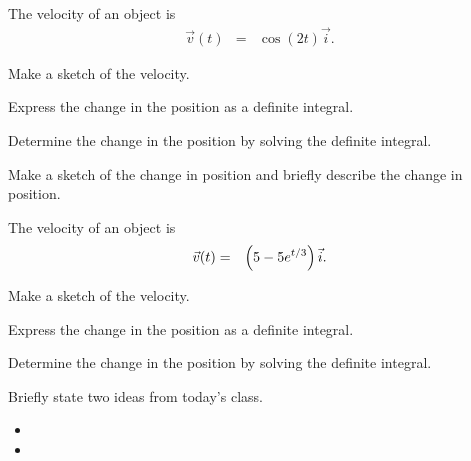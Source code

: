 \begin{problem}
\item The velocity of an object is 
  \begin{eqnarray*}
    \vec{v}(t) & = & \cos(2t) \vec{i}.
  \end{eqnarray*}
  \begin{subproblem}
  \item Make a sketch of the velocity.  
    \vfill
  \item Express the change in the position as a definite integral.
    \vfill
  \item Determine the change in the position by solving the definite
    integral.
    \vfill
  \item Make a sketch of the change in position and briefly describe
    the change in position.
    \vfill
  \end{subproblem}
  \clearpage

\item The velocity of an object is 
  \begin{eqnarray*}
    \vec{v}(t) & = & \left( 5 - 5 e^{t/3} \right) \vec{i}.
  \end{eqnarray*}
  \begin{subproblem}
  \item Make a sketch of the velocity.  
    \vfill
  \item Express the change in the position as a definite integral.
    \vfill
  \item Determine the change in the position by solving the definite
    integral.
    \vfill
  \end{subproblem}

\end{problem}

\postClass

\begin{problem}
\item Briefly state two ideas from today's class.
  \begin{itemize}
  \item 
  \item 
  \end{itemize}
\item 
  \begin{subproblem}
    \item
  \end{subproblem}
\end{problem}


